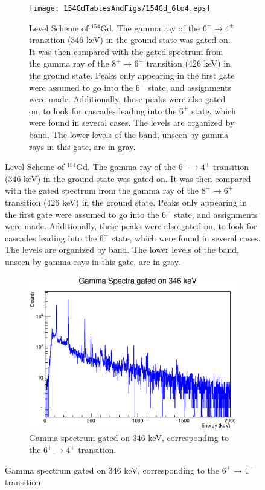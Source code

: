 \begin{landscape}
\begin{figure}[!]
    \centering
    \begin{subfigure}{1.4\textwidth}
    \texttt{[image: 154GdTablesAndFigs/154Gd\_6to4.eps]}
    \caption{\label{fig:154_6to4level}Level Scheme of $^{154}$Gd. The gamma ray of the $6^+\rightarrow4^+$ transition (346 keV) in the ground state was gated on. It was then compared with the gated spectrum from the gamma ray of the $8^+\rightarrow6^+$ transition (426 keV) in the ground state. Peaks only appearing in the first gate were assumed to go into the $6^+$ state, and assignments were made. Additionally, these peaks were also gated on, to look for cascades leading into the $6^+$ state, which were found in several cases. The levels are organized by band. The lower levels of the band, unseen by gamma rays in this gate, are in gray.}
    \end{subfigure}
    \label{fig:154_6to4}
    \end{figure}
    \begin{figure}
    \ContinuedFloat
    \begin{subfigure}{1.4\textwidth}
    \includegraphics[]{154GdTablesAndFigs/346GateSpectrum.eps}
    \caption{Gamma spectrum gated on 346 keV, corresponding to the $6^+\rightarrow4^+$ transition.}
    \label{fig:154_6to4spec}
    \end{subfigure}
\end{figure}
\end{landscape}